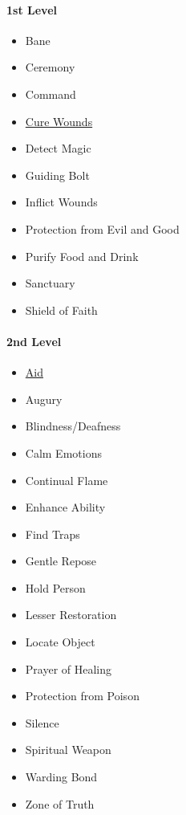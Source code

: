 \paragraph{1st Level}\label{Cleric_Spells_1st-level}

\begin{itemize}
\item
  Bane
\item
  Ceremony
\item
  Command
\item
  \hyperref[Spell_Cure_Wounds_cure-wounds]{Cure Wounds}
\item
  Detect Magic
\item
  Guiding Bolt
\item
  Inflict Wounds
\item
  Protection from Evil and Good
\item
  Purify Food and Drink
\item
  Sanctuary
\item
  Shield of Faith
\end{itemize}

\paragraph{2nd Level}\label{Cleric_Spells_2nd-level}

\begin{itemize}
\item
  \hyperref[Spell_Aid_aid]{Aid}
\item
  Augury
\item
  Blindness/Deafness
\item
  Calm Emotions
\item
  Continual Flame
\item
  Enhance Ability
\item
  Find Traps
\item
  Gentle Repose
\item
  Hold Person
\item
  Lesser Restoration
\item
  Locate Object
\item
  Prayer of Healing
\item
  Protection from Poison
\item
  Silence
\item
  Spiritual Weapon
\item
  Warding Bond
\item
  Zone of Truth
\end{itemize}

